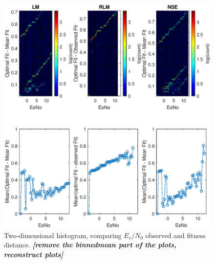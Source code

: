 \begin{figure}
\centering
\includegraphics[scale=0.9]{figures/c_sim_results/sim22_2dhist.eps}
\caption{Two-dimensional histogram, comparing $E_s/N_0$ observed and fitness distance. \textit{\textbf{[remove the binnedmean part of the plots, reconstruct plots]}}}
\label{fig:cSimBin2dHist}
\end{figure}

